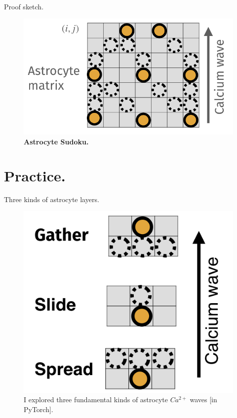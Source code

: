 \documentclass[10pt]{beamer}
\begin{document}
\begin{frame}[fragile]{Proof sketch.}
\begin{figure}
    \centering
    \includegraphics[scale=0.3]{images/aan.png} 
    \caption{\textbf{Astrocyte Sudoku.}}
\end{figure}
\end{frame}


\section[In practice.]{Practice.}
\begin{frame}[fragile]{Three kinds of astrocyte layers.}
\begin{figure}
\centering
\includegraphics[scale=0.3]{images/layers.png}     
\caption{I explored three fundamental kinds of astrocyte $Ca^{2+}$ waves [in PyTorch].}
\end{figure}
\end{frame}
\end{document}
